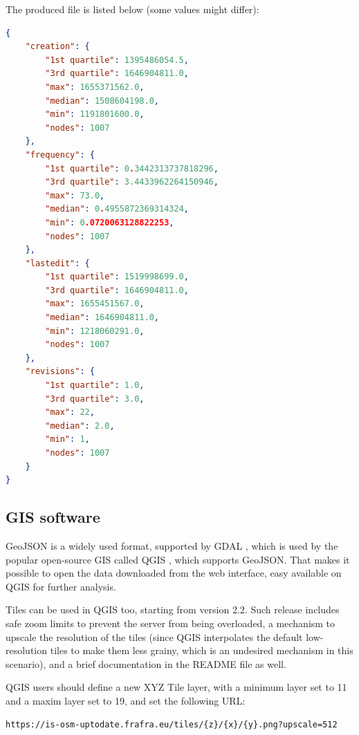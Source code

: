 \documentclass{Configuration_Files/PoliMi3i_thesis}
\begin{document}
\noindent The produced file is listed below (some values might differ):

\begin{lstlisting}[language=json]
{
    "creation": {
        "1st quartile": 1395486054.5,
        "3rd quartile": 1646904811.0,
        "max": 1655371562.0,
        "median": 1508604198.0,
        "min": 1191801600.0,
        "nodes": 1007
    },
    "frequency": {
        "1st quartile": 0.3442313737818296,
        "3rd quartile": 3.4433962264150946,
        "max": 73.0,
        "median": 0.4955872369314324,
        "min": 0.0720063128822253,
        "nodes": 1007
    },
    "lastedit": {
        "1st quartile": 1519998699.0,
        "3rd quartile": 1646904811.0,
        "max": 1655451567.0,
        "median": 1646904811.0,
        "min": 1218060291.0,
        "nodes": 1007
    },
    "revisions": {
        "1st quartile": 1.0,
        "3rd quartile": 3.0,
        "max": 22,
        "median": 2.0,
        "min": 1,
        "nodes": 1007
    }
}
\end{lstlisting}

\subsection{GIS software}

GeoJSON is a widely used format, supported by GDAL \cite{GeoJSONGDALDocumentation}, which is used by the popular open-source GIS called QGIS \cite{QgisQGIS2022}, which supports GeoJSON. That makes it possible to open the data downloaded from the web interface, easy available on QGIS for further analysis.

Tiles can be used in QGIS too, starting from version 2.2. Such release includes safe zoom limits to prevent the server from being overloaded, a mechanism to upscale the resolution of the tiles (since QGIS interpolates the default low-resolution tiles to make them less grainy, which is an undesired mechanism in this scenario), and a brief documentation in the README file as well.

QGIS users should define a new XYZ Tile layer, with a minimum layer set to 11 and a maxim layer set to 19, and set the following URL:

\begin{lstlisting}
https://is-osm-uptodate.frafra.eu/tiles/{z}/{x}/{y}.png?upscale=512
\end{lstlisting}
\end{document}
